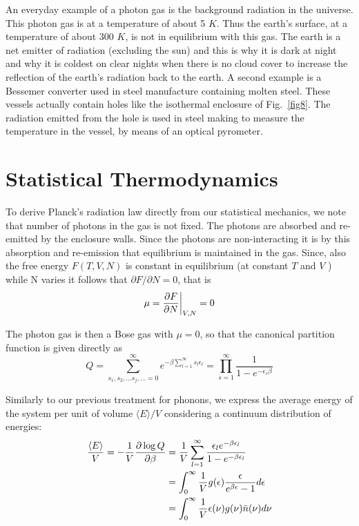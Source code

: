\documentclass[book.tex]{subfiles}
\begin{document}
An everyday example of a photon gas is the background radiation in the universe. This photon gas is at a temperature of about 5 $K$. Thus the earth's surface, at a temperature of about 300 $K$, is not in equilibrium with this gas. The earth is a net emitter of radiation (excluding the sun) and this is why it is dark at night and why it is coldest on clear nights when there is no cloud cover to increase the reflection of the earth's radiation back to the earth. A second example is a Bessemer converter used in steel manufacture containing molten steel. These vessels actually contain holes like the isothermal enclosure of Fig.~\ref{fig8}. The radiation emitted from the hole is used in steel making to measure the temperature in the vessel, by means of an optical pyrometer.

\section*{\textbf{\Large{Statistical Thermodynamics}}}
To derive Planck's radiation law directly from our statistical mechanics, we note that number of photons in the gas is not fixed. The photons are absorbed and re-emitted by the enclosure walls. Since the photons are non-interacting it is by this absorption and re-emission that equilibrium is maintained in the gas. Since, also the free energy $F(T, V, N)$ is constant in equilibrium (at constant $T$ and $V$ ) while N varies it follows that $\partial F/\partial N = 0$, that is
\begin{equation}
\mu = \frac{\partial F}{\partial N}\bigg|_{V,N} = 0 \notag
\end{equation}

The photon gas is then a Bose gas with $\mu= 0$, so that the canonical partition function is given directly as
\begin{equation}\label{Part_photon}
Q = \sum_{s_1,s_2,...s_j,... = 0}^\infty e^{- \beta \sum_{l=1}^\infty s_l\epsilon_l} = \prod_{s=1}^\infty \frac{1}{1-e^{-\epsilon_{s}\beta}}
\end{equation}

Similarly to our previous treatment for phonons, we express the average energy of the system per unit of volume $\langle E\rangle/V$ considering a continuum distribution of energies:
\begin{align}\label{Energy_Density}
\frac{\langle E \rangle}{V} = -\frac{1}{V}\frac{\partial \log Q}{\partial \beta} &= \frac{1}{V}\sum_{l=1}^\infty \frac{\epsilon_le^{-\beta\epsilon_l}}{1 - e^{-\beta\epsilon_l}} \notag\\
&= \int_0^\infty \frac{1}{V}g(\epsilon)  \frac{\epsilon}{e^{\beta\epsilon}-1} d\epsilon \notag\\
&= \int_0^\infty \frac{1}{V}\epsilon(\nu)g(\nu)\bar{n}(\nu) d\nu
\end{align}
\end{document}
